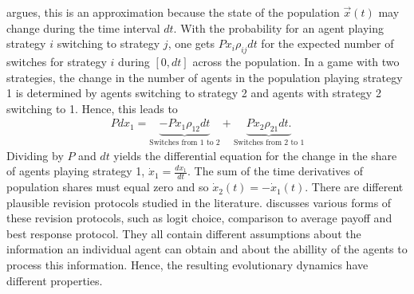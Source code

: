 \textcite{sandholm_population_2010} argues, this is an approximation because
the state of the population $\vec{x}(t)$ may change during the time interval $dt$.
With the probability for an agent playing strategy $i$ switching to strategy
$j$, one gets $P x_i \rho_{ij} dt$ for the expected number of 
switches for strategy $i$ during $[0,dt]$ across the population.   
In a game with two strategies, the change in the number 
of agents in the population playing strategy 1 is determined 
by agents switching to strategy 2 and agents with strategy 2 
switching to 1. Hence, this leads to
\begin{align} 
        Pdx_1 =  \underbrace{-Px_1 \rho_{12}dt}_{\text{Switches from 1 to 2}} 
        + \underbrace{Px_2 \rho_{21}dt.}_{\text{Switches from 2 to 1}}
\end{align}
Dividing by $P$ and $dt$ yields the differential equation for
the change in the share of agents playing strategy 1, 
$\dot{x}_1 =\frac{dx_1}{dt}$. 
The sum of the time derivatives of population shares must equal zero and so
$\dot{x}_2(t) =- \dot{x}_1(t)$.
There are different plausible revision protocols studied in the literature. 
\textcite{sandholm_population_2010} discusses various forms of 
these revision protocols, such as logit choice, comparison to average payoff 
and best response protocol. 
They all contain different assumptions about the information 
an individual agent can obtain and about the abillity of the agents 
to process this information. Hence, the resulting evolutionary 
dynamics have different properties.

